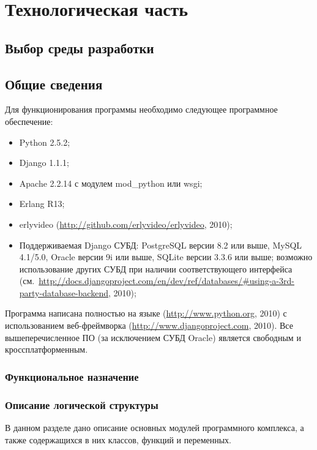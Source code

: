 \chapter{Технологическая часть}
\section{Выбор среды разработки}

\section{Общие сведения}
\label{sec:soft_description:general}

Для функционирования программы необходимо следующее программное обеспечение:
\begin{itemize}
\item Python 2.5.2;
\item Django 1.1.1;
\item Apache 2.2.14 с модулем mod\_python или wsgi;
\item Erlang R13;
\item erlyvideo (\url{http://github.com/erlyvideo/erlyvideo}, 2010);
\item Поддерживаемая Django СУБД: PostgreSQL версии 8.2 или выше, MySQL 4.1/5.0, Oracle версии 9i или выше, SQLite версии 3.3.6 или выше; возможно использование других СУБД при наличии соответствующего интерфейса (см.~\url{http://docs.djangoproject.com/en/dev/ref/databases/#using-a-3rd-party-database-backend}, 2010);
\end{itemize}

Программа написана полностью на языке  (\url{http://www.python.org}, 2010) с использованием веб-фреймворка  (\url{http://www.djangoproject.com}, 2010). Все вышеперечисленное ПО (за исключением СУБД Oracle) является свободным и кроссплатформенным.

\subsection{Функциональное назначение}

\subsection{Описание логической структуры}

В данном разделе дано описание основных модулей программного комплекса, а также содержащихся в них классов, функций и переменных.

